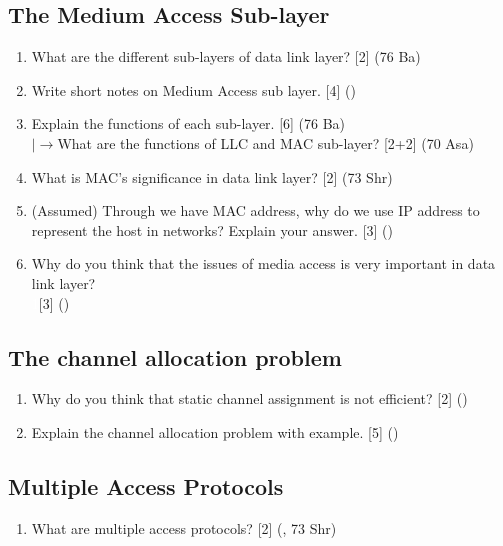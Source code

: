\documentclass[12pt]{article}
\newcommand{\lb}{\\$\left|\rightarrow\right.$}
\newcommand{\enter}{\\\textcolor{white}{1}}
\begin{document}
	\subsection{The Medium Access Sub-layer}
		\begin{enumerate}[noitemsep, topsep=0pt]
			\item What are the different sub-layers of data link layer? \hfill [2] (76 Ba)

			\item Write short notes on Medium Access sub layer. \hfill [4] ()

			\item Explain the functions of each sub-layer. \hfill [6] (76 Ba)
			\lb What are the functions of LLC and MAC sub-layer? \hfill [2+2] (70 Asa)

			\item What is MAC's significance in data link layer? \hfill [2] (73 Shr)

			\item (Assumed) Through we have MAC address, why do we use IP address to represent the host in networks? Explain your answer. \hfill [3] ()

			\item Why do you think that the issues of media access is very important in data link layer?
			\enter\hfill [3] ()
		\end{enumerate}

	\subsection{The channel allocation problem}
		\begin{enumerate}[noitemsep, topsep=0pt]
			\item Why do you think that static channel assignment is not efficient? \hfill [2] () 
			\item Explain the channel allocation problem with example. \hfill[5] ()
		\end{enumerate}

	\subsection{Multiple Access Protocols}
		\begin{enumerate}[noitemsep, topsep=0pt]
			\item What are multiple access protocols? \hfill [2] (, 73 Shr)
		\end{enumerate}
\end{document}
